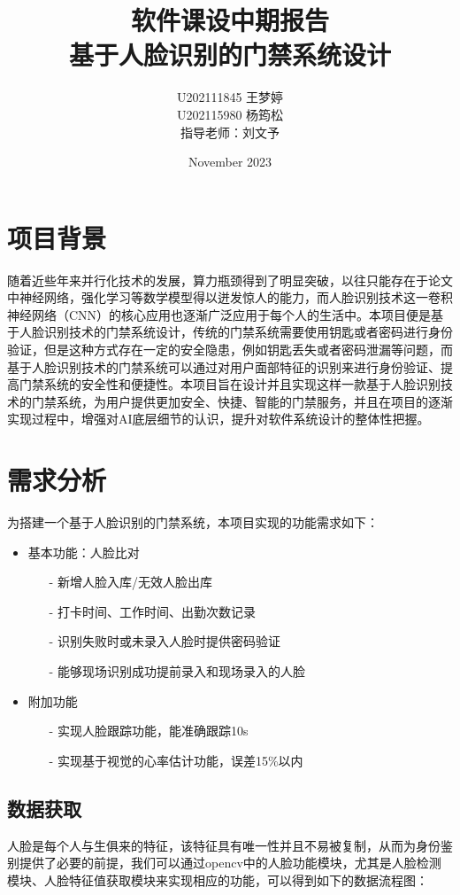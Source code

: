 \documentclass{article}
\title{软件课设中期报告\\基于人脸识别的门禁系统设计}
\author{U202111845 王梦婷 \\ U202115980 杨筠松 \\ 指导老师：刘文予}
\date{November 2023}
\begin{document}
\maketitle

\newpage 
\tableofcontents
\newpage

\section{项目背景}
随着近些年来并行化技术的发展，算力瓶颈得到了明显突破，以往只能存在于论文中神经网络，强化学习等数学模型得以迸发惊人的能力，而人脸识别技术这一卷积神经网络（CNN）的核心应用也逐渐广泛应用于每个人的生活中。本项目便是基于人脸识别技术的门禁系统设计，传统的门禁系统需要使用钥匙或者密码进行身份验证，但是这种方式存在一定的安全隐患，例如钥匙丢失或者密码泄漏等问题，而基于人脸识别技术的门禁系统可以通过对用户面部特征的识别来进行身份验证、提高门禁系统的安全性和便捷性。本项目旨在设计并且实现这样一款基于人脸识别技术的门禁系统，为用户提供更加安全、快捷、智能的门禁服务，并且在项目的逐渐实现过程中，增强对AI底层细节的认识，提升对软件系统设计的整体性把握。
\section{需求分析}
为搭建一个基于人脸识别的门禁系统，本项目实现的功能需求如下：

\begin{itemize}
    \item 基本功能：人脸比对
    \begin{itemize}
        \item[-] 新增人脸入库/无效人脸出库
        \item[-] 打卡时间、工作时间、出勤次数记录
        \item[-] 识别失败时或未录入人脸时提供密码验证
        \item[-] 能够现场识别成功提前录入和现场录入的人脸
    \end{itemize}
    \item 附加功能
    \begin{itemize}
        \item[-] 实现人脸跟踪功能，能准确跟踪10s
        \item[-] 实现基于视觉的心率估计功能，误差15\%以内
    \end{itemize}
\end{itemize}

\subsection{数据获取}
人脸是每个人与生俱来的特征，该特征具有唯一性并且不易被复制，从而为身份鉴别提供了必要的前提，我们可以通过opencv中的人脸功能模块，尤其是人脸检测模块、人脸特征值获取模块来实现相应的功能，可以得到如下的数据流程图：
\end{document}
